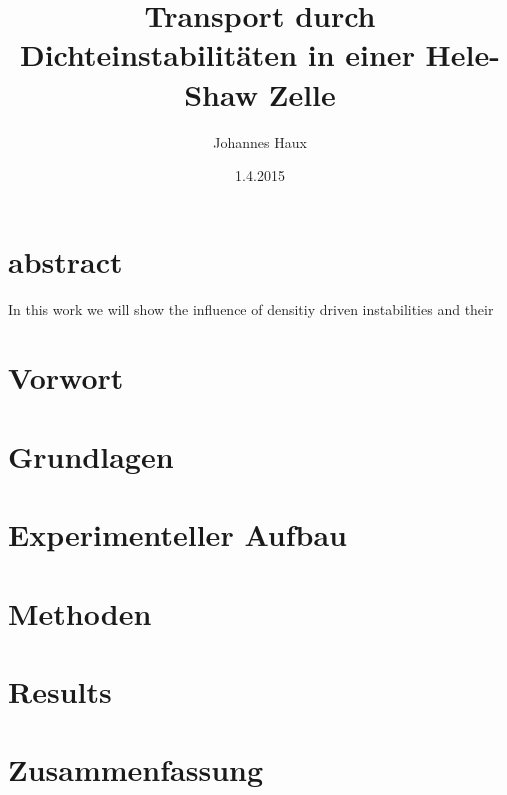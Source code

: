 \documentclass[oneside, a4paper, DIV=11,twocolumn]{book}
\title{Transport durch Dichteinstabilitäten in einer Hele-Shaw Zelle}
\author{Johannes Haux}
\date{1.4.2015}
\begin{document}

\maketitle

\onecolumn
\chapter*{abstract}
  
  In this work we will show the influence of densitiy driven instabilities and their 
\twocolumn
\tableofcontents
\listoffigures

\chapter{Vorwort}


\chapter{Grundlagen}


\chapter{Experimenteller Aufbau}


\chapter{Methoden}


\chapter{Results}


\chapter{Zusammenfassung}





\end{document}
